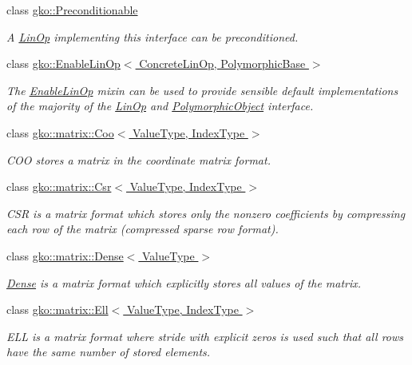 \begin{DoxyCompactItemize}
class \hyperlink{classgko_1_1Preconditionable}{gko\+::\+Preconditionable}
\begin{DoxyCompactList}\small\item\em A \hyperlink{classgko_1_1LinOp}{Lin\+Op} implementing this interface can be preconditioned. \end{DoxyCompactList}\item 
class \hyperlink{classgko_1_1EnableLinOp}{gko\+::\+Enable\+Lin\+Op$<$ Concrete\+Lin\+Op, Polymorphic\+Base $>$}
\begin{DoxyCompactList}\small\item\em The \hyperlink{classgko_1_1EnableLinOp}{Enable\+Lin\+Op} mixin can be used to provide sensible default implementations of the majority of the \hyperlink{classgko_1_1LinOp}{Lin\+Op} and \hyperlink{classgko_1_1PolymorphicObject}{Polymorphic\+Object} interface. \end{DoxyCompactList}\item 
class \hyperlink{classgko_1_1matrix_1_1Coo}{gko\+::matrix\+::\+Coo$<$ Value\+Type, Index\+Type $>$}
\begin{DoxyCompactList}\small\item\em C\+OO stores a matrix in the coordinate matrix format. \end{DoxyCompactList}\item 
class \hyperlink{classgko_1_1matrix_1_1Csr}{gko\+::matrix\+::\+Csr$<$ Value\+Type, Index\+Type $>$}
\begin{DoxyCompactList}\small\item\em C\+SR is a matrix format which stores only the nonzero coefficients by compressing each row of the matrix (compressed sparse row format). \end{DoxyCompactList}\item 
class \hyperlink{classgko_1_1matrix_1_1Dense}{gko\+::matrix\+::\+Dense$<$ Value\+Type $>$}
\begin{DoxyCompactList}\small\item\em \hyperlink{classgko_1_1matrix_1_1Dense}{Dense} is a matrix format which explicitly stores all values of the matrix. \end{DoxyCompactList}\item 
class \hyperlink{classgko_1_1matrix_1_1Ell}{gko\+::matrix\+::\+Ell$<$ Value\+Type, Index\+Type $>$}
\begin{DoxyCompactList}\small\item\em E\+LL is a matrix format where stride with explicit zeros is used such that all rows have the same number of stored elements. \end{DoxyCompactList}\item 

\end{DoxyCompactItemize}
